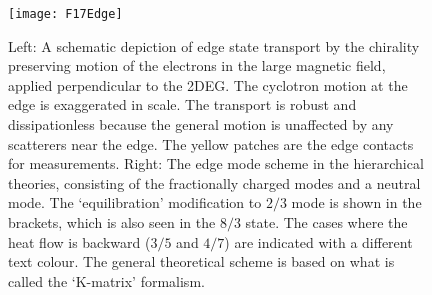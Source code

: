 \documentclass[aps,preprint,12pt,tightenlines]{revtex4}%
\begin{document}
\begin{figure}
	\centering
	\texttt{[image: F17Edge]}
	\caption{Left: A schematic depiction of edge state transport by the chirality
		preserving motion of the electrons in the large magnetic field, applied
		perpendicular to the 2DEG. The cyclotron motion at the edge is exaggerated in
		scale. The transport is robust and dissipationless because the general motion
		is unaffected by any scatterers near the edge. The yellow patches are the edge
		contacts for measurements. Right: The edge mode scheme in the hierarchical
		theories, consisting of the fractionally charged modes and a neutral mode. The
		`equilibration' modification to $2/3$ mode is shown in the brackets, which is
		also seen in the $8/3$ state. The cases where the heat flow is backward ($3/5$
		and $4/7$) are indicated with a different text colour. The general theoretical
		scheme is based on what is called the `K-matrix' formalism.}
	\label{fig:edge}
\end{figure}
\end{document}
